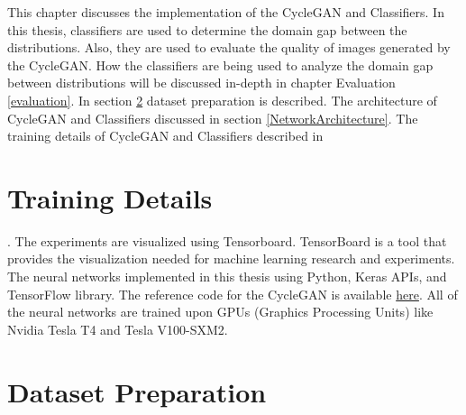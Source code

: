 \justifying
\setlength{\parskip}{1em}

This chapter discusses the implementation of the \ac{CycleGAN} and Classifiers. In this thesis, classifiers are used to determine the domain gap between the distributions. Also, they are used to evaluate the quality of images generated by the \ac{CycleGAN}. How the classifiers are being used to analyze the domain gap between distributions will be discussed in-depth in chapter Evaluation \ref{evaluation}. In section \ref{DatasetPreparation} dataset preparation is described. The architecture of \ac{CycleGAN} and Classifiers discussed in section \ref{NetworkArchitecture}. The training details of \ac{CycleGAN} and Classifiers described in \section{Training Details}. The experiments are visualized using Tensorboard\footnotemark. TensorBoard is a tool that provides the visualization needed for machine learning research and experiments. The neural networks implemented in this thesis using Python, Keras APIs, and TensorFlow library\cite{tensorflow2015-whitepaper}. The reference code for the \ac{CycleGAN} is available \href{https://keras.io/examples/generative/cyclegan/}{here}. All of the neural networks are trained upon GPUs (Graphics Processing Units) like Nvidia Tesla T4 and Tesla V100-SXM2.



\section{Dataset Preparation}\label{DatasetPreparation}

